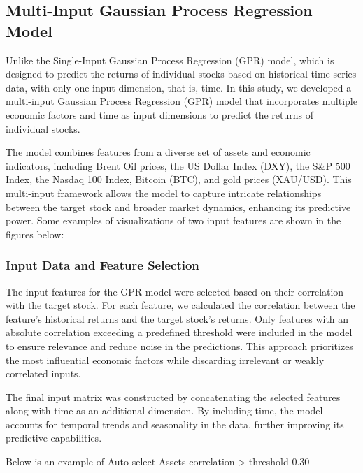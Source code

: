 \subsection{Multi-Input Gaussian Process Regression Model}
Unlike the Single-Input Gaussian Process Regression (GPR) model, which is designed to predict the returns of individual stocks based on historical time-series data, with only one input dimension, that is, time. 
In this study, we developed a multi-input Gaussian Process Regression (GPR) model that incorporates multiple economic factors and time as input dimensions to predict the returns of individual stocks. 

The model combines features from a diverse set of assets and economic indicators, including Brent Oil prices, the US Dollar Index (DXY), the S\&P 500 Index, the Nasdaq 100 Index, Bitcoin (BTC), and gold prices (XAU/USD). This multi-input framework allows the model to capture intricate relationships between the target stock and broader market dynamics, enhancing its predictive power. Some examples of visualizations of two input features are shown in the figures below:

\subsubsection{Input Data and Feature Selection}

The input features for the GPR model were selected based on their correlation with the target stock. For each feature, we calculated the correlation between the feature's historical returns and the target stock's returns. Only features with an absolute correlation exceeding a predefined threshold were included in the model to ensure relevance and reduce noise in the predictions. This approach prioritizes the most influential economic factors while discarding irrelevant or weakly correlated inputs.

The final input matrix was constructed by concatenating the selected features along with time as an additional dimension. By including time, the model accounts for temporal trends and seasonality in the data, further improving its predictive capabilities.

Below is an example of Auto-select Assets correlation > threshold 0.30

